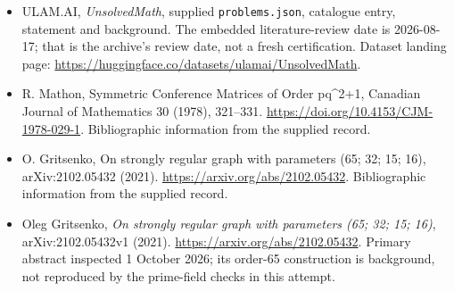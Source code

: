 \documentclass[11pt,a4paper]{article}
\begin{document}
{\small

\begin{itemize}

\item[\hypertarget{source:statement:1}{S1}] ULAM.AI, \emph{UnsolvedMath}, supplied \texttt{problems.json}, catalogue entry, statement and background. The embedded literature-review date is 2026-08-17; that is the archive’s review date, not a fresh certification. Dataset landing page: \url{https://huggingface.co/datasets/ulamai/UnsolvedMath}.

\item[\hypertarget{source:statement:2}{S2}] R. Mathon, Symmetric Conference Matrices of Order pq\textasciicircum{}2+1, Canadian Journal of Mathematics 30 (1978), 321–331. \url{https://doi.org/10.4153/CJM-1978-029-1}. Bibliographic information from the supplied record.

\item[\hypertarget{source:statement:3}{S3}] O. Gritsenko, On strongly regular graph with parameters (65; 32; 15; 16), arXiv:2102.05432 (2021). \url{https://arxiv.org/abs/2102.05432}. Bibliographic information from the supplied record.


\item[E1] Oleg Gritsenko, \emph{On strongly regular graph with
parameters (65; 32; 15; 16)}, arXiv:2102.05432v1 (2021).
\url{https://arxiv.org/abs/2102.05432}. Primary abstract inspected
1 October 2026; its order-65 construction is background, not reproduced
by the prime-field checks in this attempt.

\end{itemize}

}

\label{end:statement}
\end{document}
